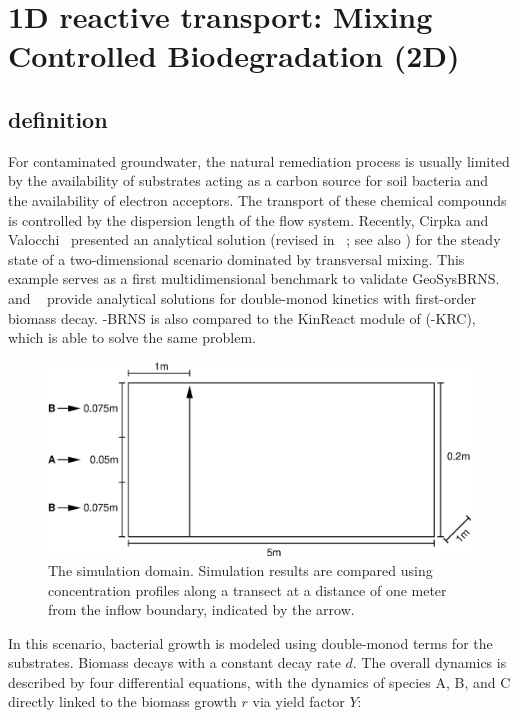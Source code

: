 \section[Degradation with double Monod kinetics (2D)]{1D reactive transport: Mixing Controlled Biodegradation (2D)}

\subsection{definition}
\label{sec:GS_BRNS_2D}
For contaminated groundwater, the natural remediation process is usually
limited by the availability of substrates acting as a carbon source for
soil bacteria and the availability of electron acceptors. The transport of
these chemical compounds is controlled by the dispersion length of the flow system.
Recently, Cirpka and Valocchi~\cite{Cirpka:07} presented an analytical solution (revised in ~\cite{Cirpka:09}; see also \cite{ShaoH:08}) for the steady state of a two-dimensional scenario dominated by transversal mixing. This
example serves as a first multidimensional benchmark to validate GeoSysBRNS.
\cite{Cirpka:07} and ~\cite{Cirpka:09} provide analytical solutions for double-monod kinetics with first-order biomass decay. \GeoSys-BRNS is also compared to the KinReact module of \GeoSys (\GeoSys-KRC), which is able to solve the same problem.

\begin{figure}[th]
\centering
\includegraphics[scale=0.5]{PART_III/HC/monod_domain.eps}
\caption{The simulation domain. Simulation results are compared using concentration profiles along a transect at a distance of one meter from the inflow boundary, indicated by the arrow. } \label{fig:monoddomain}
\end{figure}

In this scenario, bacterial growth is modeled using double-monod terms for the substrates. Biomass decays with
a constant decay rate $d$. The overall dynamics is described by four
differential equations, with the dynamics of species A, B, and C directly linked to the biomass growth $r$ via yield factor $Y$:

